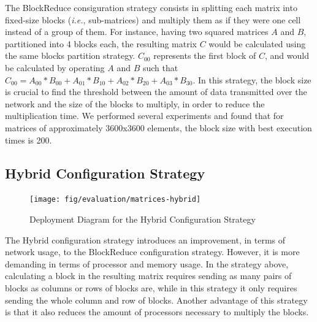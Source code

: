 \documentclass{article}
\begin{document}
The BlockReduce consiguration strategy consists in splitting each matrix into fixed-size blocks (\textit{i.e.}, sub-matrices) and multiply them as if they were one cell instead of a group of them. For instance, having two squared matrices $A$ and $B$, partitioned into 4 blocks each, the resulting matrix $C$ would be calculated using the same blocks partition strategy. $C_{00}$ represents the first block of $C$, and would be calculated by operating $A$ and $B$ such that $C_{00} = A_{00}*B_{00} + A_{01}*B_{10} + A_{02}*B_{20} + A_{03}*B_{30}$. In this strategy, the block size is crucial to find the threshold between the amount of data transmitted over the network and the size of the blocks to multiply, in order to reduce the multiplication time. We performed several experiments and found that for matrices of approximately 3600x3600 elements, the block size with best execution times is 200.

\subsection{Hybrid Configuration Strategy}

\begin{figure}[H]
	\centering
	\texttt{[image: fig/evaluation/matrices-hybrid]}
	\caption[]{Deployment Diagram for the Hybrid Configuration Strategy}
	\label{fig:apx-eval-amelia-hybrid}
\end{figure}

The Hybrid configuration strategy introduces an improvement, in terms of network usage, to the BlockReduce configuration strategy. However, it is more demanding in terms of processor and memory usage. In the strategy above, calculating a block in the resulting matrix requires sending as many pairs of blocks as columns or rows of blocks are, while in this strategy it only requires sending the whole column and row of blocks. Another advantage of this strategy is that it also reduces the amount of processors necessary to multiply the blocks.
\end{document}
